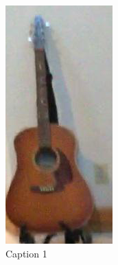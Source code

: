 \begin{figure}[h!]
\begin{minipage}[b]{0.1\textwidth}
        \caption{Caption 1}
    \end{minipage}
    \hspace{1em} %
    \begin{minipage}[b]{0.1\textwidth}
        \centering
        \includegraphics[width=\textwidth]{images/cropping_method_1.png}

\end{minipage}
\end{figure}
